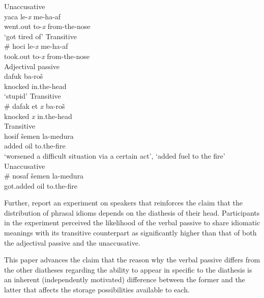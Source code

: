 \documentclass[output=paper]{langsci/langscibook}
\begin{document}
\ea\label{ex:20.1} 
    \ea Unaccusative\\
       \gll    yaca  le-\emph{x} me-ha-af \\
                went.out to-\emph{x} from-the-nose \\
            \glt    \enquote*{got tired of}
    \ex Transitive\\
    \gll \# hoci   le-\emph{x} me-ha-af \\
        {} took.out to-\emph{x} from-the-nose \\
    \z
\ex \label{ex:20.2} 
    \ea Adjectival passive\\
        \gll    dafuk   ba-roš \\
                knocked in.the-head \\
            \glt    \enquote*{stupid}
    \ex Transitive\\
    \gll  \# dafak et \emph{x} ba-roš \\
          {} knocked \Acc{} \emph{x} in.the-head \\
    \z
\ex \label{ex:20.3} 
    \ea Transitive\\
         \gll    hosif šemen la-medura \\
                added oil to.the-fire \\
        \glt   \enquote*{worsened a difficult situation via a certain act},
    \enquote*{added fuel to the fire}
    \ex Unaccusative\\
        \gll  \#  nosaf šemen la-medura\\
              {}  got.added oil  to.the-fire \\
    \z
\z

Further, \textcite{SilHorKluWex2018} report an experiment on 
speakers that reinforces the claim that the distribution of phrasal idioms
depends on the diathesis of their head. Participants in the experiment
perceived the likelihood of the verbal passive to share idiomatic meanings with
its transitive counterpart as significantly higher than that of both the
adjectival passive and the unaccusative.

This paper advances the claim that the reason why the verbal passive differs
from the other diatheses regarding the ability to appear in  specific to
the diathesis is an inherent (independently motivated) difference between the
former and the latter that affects the storage possibilities available to each.
\end{document}
